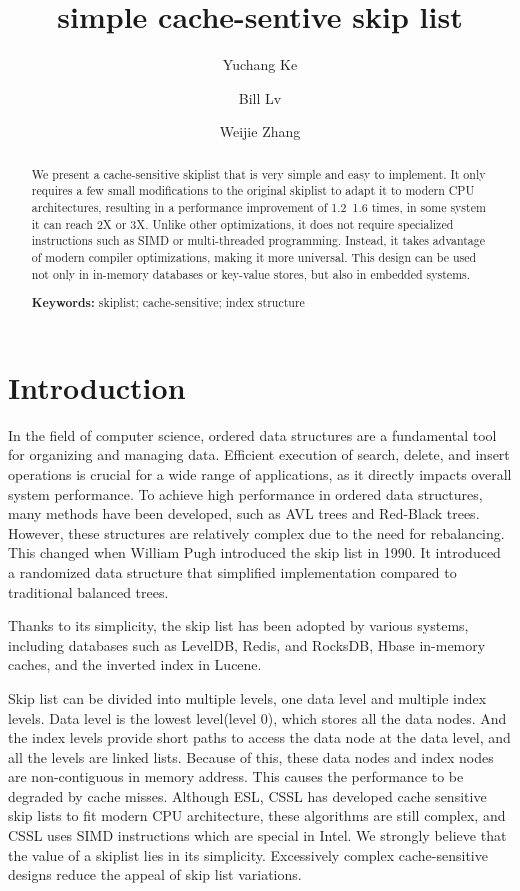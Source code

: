 \documentclass{article}
\title{simple cache-sentive skip list}
\author[1]{Yuchang Ke}
\author[2]{Bill Lv}
\author[3]{Weijie Zhang}
\affil[1]{%
  \institution{} 
  \streetaddress{}
  \city{Wuhan}
  \state{China}
  \postcode{430000}
}
\affil[2]{%
  \institution{} 
  \streetaddress{}
  \city{Wuhan}
  \state{China}
  \postcode{430000}
}
\affil[3]{%
  \institution{Hubei Changjiang Yunxin Media Group Co., Ltd} 
  \streetaddress{No. 788, Gaoxin Ave., Hubei Broadcasting&TV Media Tower}
  \city{Wuhan}
  \state{China}
  \postcode{430000}
}
\newcommand{\keywords}[1]{\par\noindent\textbf{Keywords:} #1}
\begin{document}
\maketitle

\begin{abstract}
      We present a cache-sensitive skiplist that is very simple and easy to implement. It only requires a few small modifications to the original skiplist to adapt it to modern CPU architectures, resulting in a performance improvement of 1.2~1.6 times, in some system it can reach 2X or 3X.
      Unlike other optimizations, it does not require specialized instructions such as SIMD or multi-threaded programming. Instead, it takes advantage of modern compiler optimizations, making it more universal. This design can be used not only in in-memory databases or key-value stores, but also in embedded systems.

\keywords{skiplist; cache-sensitive; index structure}
\end{abstract}



\section{Introduction}

In the field of computer science, ordered data structures are a fundamental tool for organizing and managing data. Efficient execution of search, delete, and insert operations is crucial for a wide range of applications, as it directly impacts overall system performance.
To achieve high performance in ordered data structures, many methods have been developed, such as AVL trees and Red-Black trees. However, these structures are relatively complex due to the need for rebalancing. This changed when William Pugh introduced the skip list in 1990\cite{ref1}. It introduced a randomized data structure that simplified implementation compared to traditional balanced trees.

Thanks to its simplicity, the skip list has been adopted by various systems, including databases such as LevelDB\cite{ref2}, Redis\cite{ref7}, and RocksDB\cite{ref3}, Hbase\cite{ref4} in-memory caches, and the inverted index in Lucene.

Skip list can be divided into multiple levels, one data level and multiple index levels. Data level is the lowest level(level 0), which stores all the data nodes. And the index levels provide short paths to access the data node at the data level, and all the levels are linked lists. Because of this, these data nodes and index nodes are non-contiguous in memory address. This causes the performance to be degraded by cache misses.
Although ESL, CSSL has developed cache sensitive skip lists to fit modern CPU architecture, these algorithms are still complex, and CSSL uses SIMD instructions which are special in Intel. We strongly believe that the value of a skiplist lies in its simplicity.  Excessively complex cache-sensitive designs reduce the appeal of skip list variations.
\end{document}
